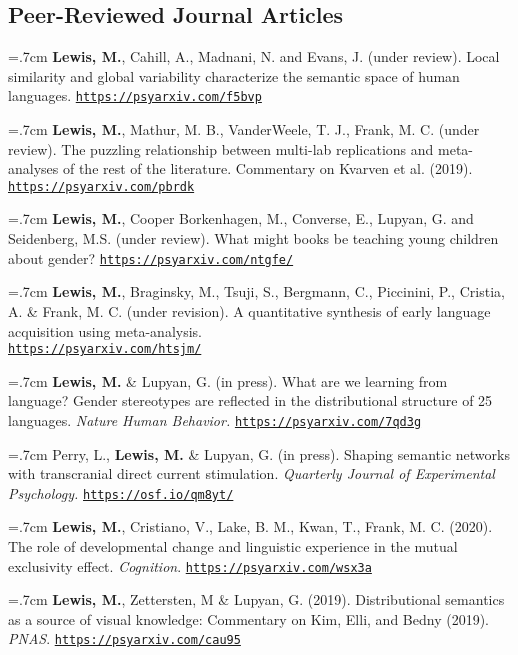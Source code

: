 \documentclass[letterpaper]{article}
\begin{document}
\subsection*{Peer-Reviewed Journal Articles}

\onehalfspacing

\hangindent=.7cm {\bf Lewis, M.}, Cahill, A., Madnani, N. and Evans, J.  (under review). Local similarity and global variability characterize the semantic space of human languages. \href{https://psyarxiv.com/f5bvp}{\tt https://psyarxiv.com/f5bvp}

\hangindent=.7cm {\bf Lewis, M.}, Mathur, M. B., VanderWeele, T. J., Frank, M. C. (under review). The puzzling relationship between multi-lab replications and meta-analyses of the rest of the literature. Commentary on Kvarven et al. (2019). \href{https://psyarxiv.com/pbrdk}{\tt https://psyarxiv.com/pbrdk}



\hangindent=.7cm {\bf Lewis, M.}, Cooper Borkenhagen, M., Converse, E., Lupyan, G. and Seidenberg, M.S. (under review). What might books be teaching young children about gender? \href{https://psyarxiv.com/ntgfe/}{\tt https://psyarxiv.com/ntgfe/}


\hangindent=.7cm {\bf Lewis, M.}, Braginsky, M., Tsuji, S., Bergmann, C., Piccinini, P., Cristia, A. \& Frank, M. C. (under revision). A quantitative synthesis of early language acquisition using meta-analysis. \\ \href{https://psyarxiv.com/htsjm/}{\tt  https://psyarxiv.com/htsjm/}


\hangindent=.7cm {\bf Lewis, M.} \& Lupyan, G. (in press). What are we learning from language? Gender stereotypes are reflected in the distributional structure of 25 languages.  {\it Nature Human Behavior.} \href{https://psyarxiv.com/7qd3g}{\tt https://psyarxiv.com/7qd3g}

\hangindent=.7cm Perry, L., {\bf Lewis, M.} \& Lupyan, G. (in press). Shaping semantic networks with transcranial direct current stimulation. {\it Quarterly Journal of Experimental Psychology.} \href{https://osf.io/qm8yt/}{\tt https://osf.io/qm8yt/}


\hangindent=.7cm {\bf Lewis, M.}, Cristiano, V., Lake, B. M., Kwan, T., Frank, M. C. (2020). The role of developmental change and linguistic experience in the mutual exclusivity effect. {\it Cognition}. \href{https://psyarxiv.com/wsx3a}{\tt https://psyarxiv.com/wsx3a}


\hangindent=.7cm {\bf Lewis, M.}, Zettersten, M \& Lupyan, G. (2019).  Distributional semantics as a source of visual knowledge: Commentary on Kim, Elli, and Bedny (2019).  {\it PNAS}. \href{https://psyarxiv.com/cau95}{\tt https://psyarxiv.com/cau95}
\end{document}

